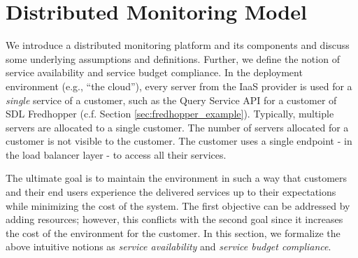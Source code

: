 
\section{Distributed Monitoring Model}
\label{sec:modelling}

We introduce a distributed monitoring platform and its components and
discuss some underlying assumptions and definitions.
Further, we define the notion of service availability and service budget compliance.
In the deployment environment (e.g., ``the cloud''), every  server from the IaaS provider is  used for a \emph{single} service of a customer, such as
the Query Service API for a customer of SDL Fredhopper (c.f. Section \ref{sec:fredhopper_example}).
Typically, multiple servers are allocated to a single customer.
The number of servers allocated for a customer is not visible to the customer.
The customer uses a single endpoint - in the load balancer layer - to access all their services.

The ultimate goal is to maintain the environment in such a way that customers and their end users experience the delivered services up to their expectations while minimizing the cost of the system.
The first objective can be addressed by adding resources; however, this conflicts with the second goal since it increases the cost of the environment for the customer.
In this section, we formalize the above intuitive notions as \emph{service availability} and \emph{service budget compliance}.

